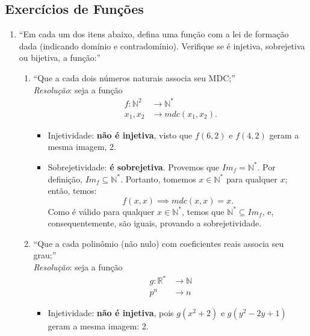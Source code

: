 \documentclass[13pt,letterpaper]{article}
\begin{document}
\subsection{Exercícios de Funções}
\begin{enumerate}
    \item \enquote{Em cada um dos itens abaixo, defina uma função com a lei
de formação dada (indicando domínio e contradomínio). Verifique se é injetiva, sobrejetiva ou bijetiva, a função:}
    \begin{enumerate}
        \item \enquote{Que a cada dois números naturais associa seu MDC;} \\
            \emph{Resolução}: seja a função 
            \begin{align*}
                f: \mathbb{N}^2 &\rightarrow \mathbb{N}^* \\
                x_1, x_2 &\rightarrow mdc(x_1, x_2).
            \end{align*} 
            \begin{itemize}
                \item Injetividade: \textbf{não é injetiva}, visto que $f(6, 2)$ e $f(4, 2)$ geram a mesma imagem, 2.
                \item Sobrejetividade: \textbf{é sobrejetiva}. Provemos que $Im_f = \mathbb{N}^*$. Por definição, $Im_f \subseteq \mathbb{N}^*$.
                Portanto, tomemos $x \in \mathbb{N}^*$ para qualquer $x$; então, temos:
                \begin{displaymath}
                    f(x, x) \implies mdc(x, x) = x.
                \end{displaymath}
                Como é válido para qualquer $x \in \mathbb{N}^*$, temos que $\mathbb{N}^* \subseteq Im_f$, e, consequentemente, são iguais, provando a sobrejetividade.
        \end{itemize}
        \item \enquote{Que a cada polinômio (não nulo) com coeficientes reais associa seu grau;} \\
            \emph{Resolução}: seja a função 
            \begin{align*}
                g: \mathbb{R}^* &\rightarrow \mathbb{N} \\
                p^n &\rightarrow n
            \end{align*}
            \begin{itemize}
                \item Injetividade: \textbf{não é injetiva}, pois $g(x^2 + 2)$ e $g(y^2 - 2y + 1)$ geram a mesma imagem: 2.

\end{itemize}
\end{enumerate}
\end{enumerate}
\end{document}
